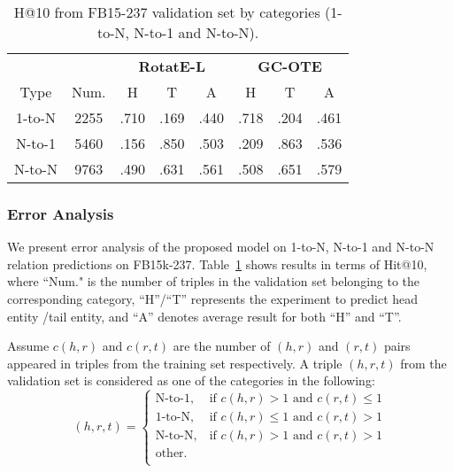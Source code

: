 \documentclass[11pt,a4paper]{article}
\begin{document}
\begin{table}[!h]
    \centering\scriptsize
    \begin{tabular}{c|c|c|c|c|c|c|c}
        \hline
         & &\multicolumn{3}{c|}{\textbf{RotatE-L}} & \multicolumn{3}{c}{\textbf{GC-OTE}} \\
        \cline{3-8}
       Type  & Num. & H &T & A & H &T & A \\
       \hline
       1-to-N & 2255 &.710 & .169 & .440 & .718 &.204 & .461 \\
       \hline
       N-to-1 & 5460 &.156 & .850 & .503 & .209 & .863 & .536 \\
       \hline
       N-to-N & 9763 &.490 & .631 & .561 & .508 & .651 & .579\\
       \hline
    \end{tabular}
    \caption{H@10 from FB15-237 validation set by categories (1-to-N, N-to-1 and N-to-N).}
    \label{tab:categories}
\end{table}

\subsubsection{Error Analysis}
We present error analysis of the proposed model on 1-to-N, N-to-1 and N-to-N relation predictions on FB15k-237. Table~\ref{tab:categories} shows results in terms of Hit@10, where ``Num." is the number of triples in the validation set belonging to the corresponding category, ``H''/``T'' represents the experiment to predict head entity /tail entity, and ``A'' denotes average result for both ``H'' and ``T''.






Assume $c(h,r)$ and $c(r,t)$ are the number of $(h,r)$ and $(r,t)$ pairs appeared in triples from the training set respectively.  A triple $(h,r,t)$ from the validation set is considered as one of the categories in the following:
\begin{equation}
(h,r,t) \!\!= \!\!\begin{cases}
\text{N-to-1},\ \!\!\!\!&\!\!\!\! \text{if } c(h,r)>1 \text{ and } c(r,t)\leq 1 \\
\text{1-to-N},\ \!\!\!\!&\!\!\!\! \text{if } c(h,r)\leq 1 \text{ and } c(r,t)>1 \\
 \text{N-to-N},\ \!\!\!\!&\!\!\!\!  \text{if } c(h,r)>1 \text{ and } c(r,t)>1 \\
\text{other.} & \nonumber\\ 
\end{cases}
\end{equation}
\end{document}
